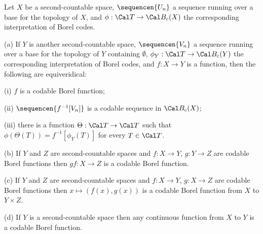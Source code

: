  Let $X$ be a second-countable space,
$\sequencen{U_n}$ a sequence running over a base for the topology of $X$,
and $\phi:\Cal T\to\Cal B_c(X)$ the corresponding interpretation of Borel
codes.

(a) If $Y$ is another second-countable space, $\sequencen{V_n}$ a
sequence running over a base for the topology of $Y$ containing
$\emptyset$, $\phi_Y:\Cal T\to\Cal B_c(Y)$ the corresponding interpretation
of Borel codes, and
$f:X\to Y$ is a function, then the following are equiveridical:

\quad(i) $f$ is a codable Borel function;

\quad(ii) $\sequencen{f^{-1}[V_n]}$ is a codable sequence in $\Cal B_c(X)$;

\quad(iii) there is a function $\Theta:\Cal T\to\Cal T$ such that
$\phi(\Theta(T))=f^{-1}[\phi_Y(T)]$ for every $T\in\Cal T$.

(b) If $Y$ and $Z$ are second-countable spaces and $f:X\to Y$, $g:Y\to Z$
are codable Borel functions then $gf:X\to Z$ is a codable Borel function.

(c) If $Y$ and $Z$ are second-countable spaces and $f:X\to Y$, $g:X\to Z$
are codable Borel functions then $x\mapsto(f(x),g(x))$ is a codable Borel
function from $X$ to $Y\times Z$.

(d) If $Y$ is a second-countable space then any continuous function
from $X$ to $Y$ is a codable Borel function.

